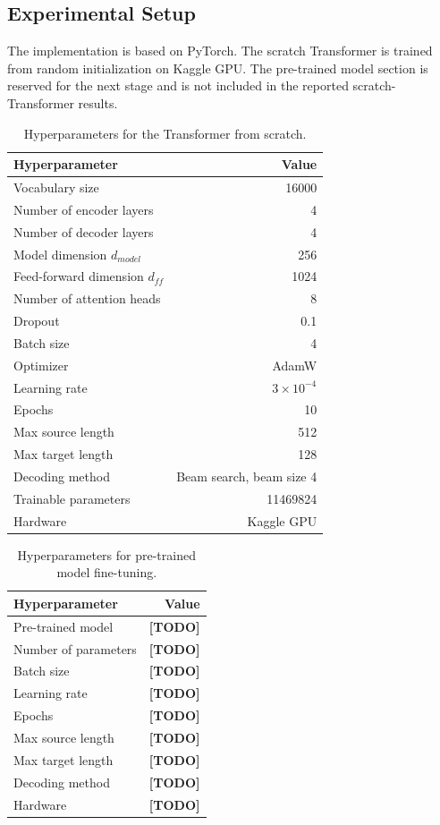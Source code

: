 \documentclass[conference]{IEEEtran}
\begin{document}
\subsection{Experimental Setup}
The implementation is based on PyTorch. The scratch Transformer is trained from random initialization on Kaggle GPU. The pre-trained model section is reserved for the next stage and is not included in the reported scratch-Transformer results.

\begin{table}[htbp]
\centering
\caption{Hyperparameters for the Transformer from scratch.}
\label{tab:hparams_scratch}
\begin{tabular}{lr}
\toprule
Hyperparameter & Value \\
\midrule
Vocabulary size & 16000 \\
Number of encoder layers & 4 \\
Number of decoder layers & 4 \\
Model dimension $d_{model}$ & 256 \\
Feed-forward dimension $d_{ff}$ & 1024 \\
Number of attention heads & 8 \\
Dropout & 0.1 \\
Batch size & 4 \\
Optimizer & AdamW \\
Learning rate & $3 \times 10^{-4}$ \\
Epochs & 10 \\
Max source length & 512 \\
Max target length & 128 \\
Decoding method & Beam search, beam size 4 \\
Trainable parameters & 11469824 \\
Hardware & Kaggle GPU \\
\bottomrule
\end{tabular}
\end{table}

\begin{table}[htbp]
\centering
\caption{Hyperparameters for pre-trained model fine-tuning.}
\label{tab:hparams_pretrained}
\begin{tabular}{lr}
\toprule
Hyperparameter & Value \\
\midrule
Pre-trained model & \textbf{[TODO]} \\
Number of parameters & \textbf{[TODO]} \\
Batch size & \textbf{[TODO]} \\
Learning rate & \textbf{[TODO]} \\
Epochs & \textbf{[TODO]} \\
Max source length & \textbf{[TODO]} \\
Max target length & \textbf{[TODO]} \\
Decoding method & \textbf{[TODO]} \\
Hardware & \textbf{[TODO]} \\
\bottomrule
\end{tabular}
\end{table}
\end{document}
